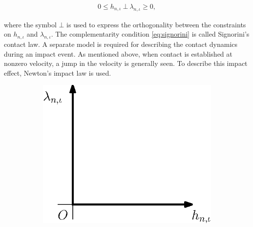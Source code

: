 \documentclass[../DC2017114Bouma.tex]{subfiles}
\begin{document}
\begin{align}
0\leq h_{n,\iota}\ \bot\ \lambda_{n,\iota} \geq 0,\label{eq:signorini}
\end{align}

where the symbol $\bot$ is used to express the orthogonality between the constraints on $h_{n,\iota}$ and $\lambda_{n,\iota}$. The complementarity condition \eqref{eq:signorini} is called Signorini's contact law. A separate model is required for describing the contact dynamics during an impact event. As mentioned above, when contact is established at nonzero velocity, a jump in the velocity is generally seen. To describe this impact effect, Newton's impact law is used.
\begin{figure}[h]
\centering
\begin{subfigure}{0.3\textwidth}
\centering
\includegraphics[width=\linewidth]{signorinicontact.eps}
\caption{}\label{fig:signorinicontact}
\end{subfigure}
\qquad
\begin{subfigure}{0.3\textwidth}
\centering

\end{subfigure}
\end{figure}
\end{document}
